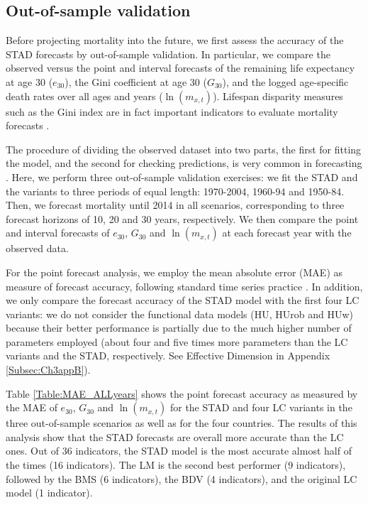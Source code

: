 \documentclass[Thesis]{subfiles}
\begin{document}
\subsection{Out-of-sample validation}\label{Subsec:Ch3subsec3.2}
Before projecting mortality into the future, we first assess the
accuracy of the STAD forecasts by out-of-sample validation. In particular, we compare the observed versus the point and interval forecasts of the remaining life expectancy at age 30 ($e_{30}$), the Gini coefficient at age 30 ($G_{30}$), and the logged age-specific death rates over all ages and years ($\ln(m_{x,t})$). Lifespan disparity measures such as the Gini index are in fact important indicators to evaluate mortality forecasts \citep{bohk2017lifespan}.	

The procedure of dividing the observed dataset into two parts, the first for fitting the model, and the second for checking predictions, is very common in forecasting \citep{chatfield2000time}. Here, we perform three out-of-sample validation exercises: we fit the STAD and the \citeauthor{lee1992modeling}  variants to three periods of equal length: 1970-2004, 1960-94 and 1950-84. Then, we forecast mortality until 2014 in all scenarios, corresponding to three forecast horizons of 10, 20 and 30 years, respectively. We then compare the point and interval forecasts of $e_{30}$, $G_{30}$ and $\ln(m_{x,t})$ at each forecast year with the observed data. 

For the point forecast analysis, we employ the mean absolute error (MAE) as measure of forecast accuracy, following standard time series practice \citep{chatfield2000time}. In addition, we only compare the forecast accuracy of the STAD model with the first four LC variants: we do not consider the functional data models (HU, HUrob and HUw) because their better performance is partially due to the much higher number of parameters employed (about four and five times more parameters than the LC variants and the STAD, respectively. See Effective Dimension in Appendix \ref{Subsec:Ch3appB}).

Table \ref{Table:MAE_ALLyears} shows the point forecast accuracy as measured by the MAE of $e_{30}$, $G_{30}$ and $\ln(m_{x,t})$ for the STAD and four LC variants in the three out-of-sample scenarios as well as for the four countries. The results of this analysis show that the STAD forecasts are overall more accurate than the LC ones. Out of 36 indicators, the STAD model is the most accurate almost half of the times (16 indicators). The LM is the second best performer (9 indicators), followed by the BMS (6 indicators), the BDV (4 indicators), and the original LC model (1 indicator). 
\end{document}
